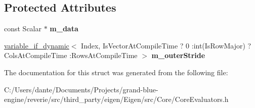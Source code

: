 \subsection*{Protected Attributes}
\begin{DoxyCompactItemize}
\item 
\mbox{\label{struct_eigen_1_1internal_1_1evaluator_3_01_plain_object_base_3_01_derived_01_4_01_4_a735a7671d9ae8d2ac17f9bf9f815de3f}} 
const Scalar $\ast$ {\bfseries m\+\_\+data}
\item 
\mbox{\label{struct_eigen_1_1internal_1_1evaluator_3_01_plain_object_base_3_01_derived_01_4_01_4_a665d96e5d816aed44dbbc7b7450a3afe}} 
\mbox{\hyperlink{class_eigen_1_1internal_1_1variable__if__dynamic}{variable\+\_\+if\+\_\+dynamic}}$<$ Index, Is\+Vector\+At\+Compile\+Time ? 0 \+:int(Is\+Row\+Major) ? Cols\+At\+Compile\+Time \+:Rows\+At\+Compile\+Time $>$ {\bfseries m\+\_\+outer\+Stride}
\end{DoxyCompactItemize}


The documentation for this struct was generated from the following file\+:\begin{DoxyCompactItemize}
\item 
C\+:/\+Users/dante/\+Documents/\+Projects/grand-\/blue-\/engine/reverie/src/third\+\_\+party/eigen/\+Eigen/src/\+Core/Core\+Evaluators.\+h\end{DoxyCompactItemize}
